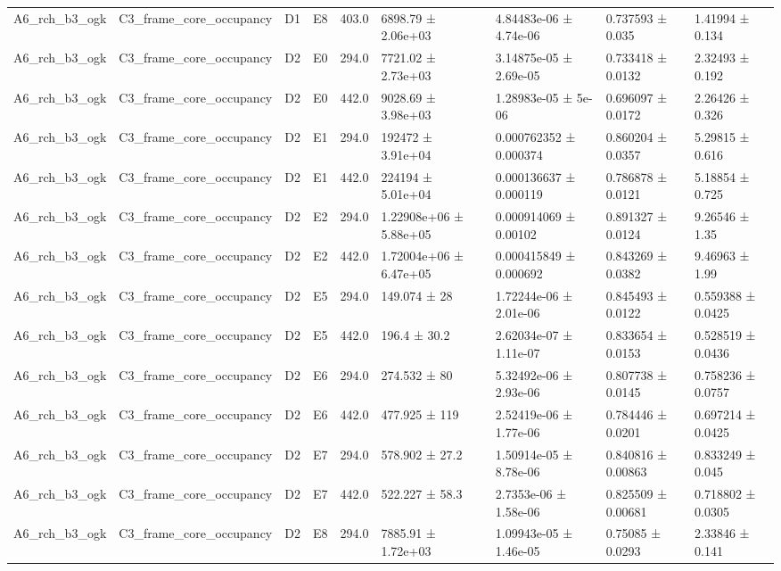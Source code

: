 \begin{table}
\begin{tabular}{lllllllll}
A6\_rch\_b3\_ogk & C3\_frame\_core\_occupancy & D1 & E8 & 403.0 & 6898.79 ± 2.06e+03 & 4.84483e-06 ± 4.74e-06 & 0.737593 ± 0.035 & 1.41994 ± 0.134 \\
A6\_rch\_b3\_ogk & C3\_frame\_core\_occupancy & D2 & E0 & 294.0 & 7721.02 ± 2.73e+03 & 3.14875e-05 ± 2.69e-05 & 0.733418 ± 0.0132 & 2.32493 ± 0.192 \\
A6\_rch\_b3\_ogk & C3\_frame\_core\_occupancy & D2 & E0 & 442.0 & 9028.69 ± 3.98e+03 & 1.28983e-05 ± 5e-06 & 0.696097 ± 0.0172 & 2.26426 ± 0.326 \\
A6\_rch\_b3\_ogk & C3\_frame\_core\_occupancy & D2 & E1 & 294.0 & 192472 ± 3.91e+04 & 0.000762352 ± 0.000374 & 0.860204 ± 0.0357 & 5.29815 ± 0.616 \\
A6\_rch\_b3\_ogk & C3\_frame\_core\_occupancy & D2 & E1 & 442.0 & 224194 ± 5.01e+04 & 0.000136637 ± 0.000119 & 0.786878 ± 0.0121 & 5.18854 ± 0.725 \\
A6\_rch\_b3\_ogk & C3\_frame\_core\_occupancy & D2 & E2 & 294.0 & 1.22908e+06 ± 5.88e+05 & 0.000914069 ± 0.00102 & 0.891327 ± 0.0124 & 9.26546 ± 1.35 \\
A6\_rch\_b3\_ogk & C3\_frame\_core\_occupancy & D2 & E2 & 442.0 & 1.72004e+06 ± 6.47e+05 & 0.000415849 ± 0.000692 & 0.843269 ± 0.0382 & 9.46963 ± 1.99 \\
A6\_rch\_b3\_ogk & C3\_frame\_core\_occupancy & D2 & E5 & 294.0 & 149.074 ± 28 & 1.72244e-06 ± 2.01e-06 & 0.845493 ± 0.0122 & 0.559388 ± 0.0425 \\
A6\_rch\_b3\_ogk & C3\_frame\_core\_occupancy & D2 & E5 & 442.0 & 196.4 ± 30.2 & 2.62034e-07 ± 1.11e-07 & 0.833654 ± 0.0153 & 0.528519 ± 0.0436 \\
A6\_rch\_b3\_ogk & C3\_frame\_core\_occupancy & D2 & E6 & 294.0 & 274.532 ± 80 & 5.32492e-06 ± 2.93e-06 & 0.807738 ± 0.0145 & 0.758236 ± 0.0757 \\
A6\_rch\_b3\_ogk & C3\_frame\_core\_occupancy & D2 & E6 & 442.0 & 477.925 ± 119 & 2.52419e-06 ± 1.77e-06 & 0.784446 ± 0.0201 & 0.697214 ± 0.0425 \\
A6\_rch\_b3\_ogk & C3\_frame\_core\_occupancy & D2 & E7 & 294.0 & 578.902 ± 27.2 & 1.50914e-05 ± 8.78e-06 & 0.840816 ± 0.00863 & 0.833249 ± 0.045 \\
A6\_rch\_b3\_ogk & C3\_frame\_core\_occupancy & D2 & E7 & 442.0 & 522.227 ± 58.3 & 2.7353e-06 ± 1.58e-06 & 0.825509 ± 0.00681 & 0.718802 ± 0.0305 \\
A6\_rch\_b3\_ogk & C3\_frame\_core\_occupancy & D2 & E8 & 294.0 & 7885.91 ± 1.72e+03 & 1.09943e-05 ± 1.46e-05 & 0.75085 ± 0.0293 & 2.33846 ± 0.141 \\

\end{tabular}
\end{table}
